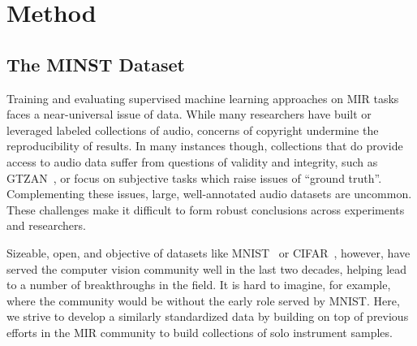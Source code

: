 \documentclass{article}
\begin{document}
\section{Method}\label{sec:typeset_text}






\subsection{The MINST Dataset}\label{subsec:body}

Training and evaluating supervised machine learning approaches on MIR tasks faces a near-universal issue of data.
While many researchers have built or leveraged labeled collections of audio, concerns of copyright undermine the reproducibility of results.
In many instances though, collections that do provide access to audio data suffer from questions of validity and integrity, such as GTZAN~\cite{tzanetakis2002musical,sturm2012analysis}, or focus on subjective tasks which raise issues of ``ground truth''.
Complementing these issues, large, well-annotated audio datasets are uncommon.
These challenges make it difficult to form robust conclusions across experiments and researchers.

Sizeable, open, and objective of datasets like MNIST~\cite{lecun1998mnist} or CIFAR~\cite{krizhevsky2009learning}, however, have served the computer vision community well in the last two decades, helping lead to a number of breakthroughs in the field.
It is hard to imagine, for example, where the community would be without the early role served by MNIST.\@
Here, we strive to develop a similarly standardized data by building on top of previous efforts in the MIR community to build collections of solo instrument samples.
\end{document}
